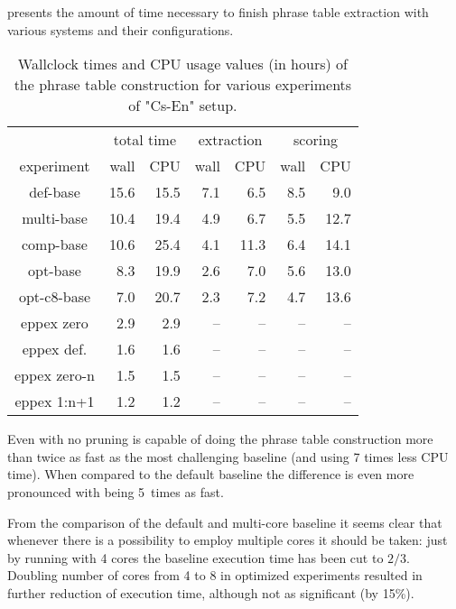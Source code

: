  presents the amount of time necessary to finish
phrase table extraction with various systems and their configurations.

\begin{table}[ht]
\centering
\begin{tabular}{ | c | r r | r r | r r | }
\hline
 & \multicolumn{2}{|c|}{total time} & \multicolumn{2}{|c|}{extraction} & \multicolumn{2}{|c|}{scoring} \\
experiment & wall & CPU & wall & CPU & wall & CPU \\
\hline
\hline
def-base      & 15.6 & 15.5 & 7.1 & 6.5 & 8.5 & 9.0 \\
multi-base    & 10.4 & 19.4 & 4.9 & 6.7 & 5.5 & 12.7 \\
comp-base     & 10.6 & 25.4 & 4.1 & 11.3 & 6.4 & 14.1 \\
opt-base      & 8.3 & 19.9 & 2.6 & 7.0 & 5.6 & 13.0 \\
opt-c8-base   & 7.0 & 20.7 & 2.3 & 7.2 & 4.7 & 13.6 \\
eppex zero    & 2.9 & 2.9 & -- & -- & -- & -- \\
\hline
eppex def.    & 1.6 & 1.6 & -- & -- & -- & -- \\
eppex zero-n  & 1.5 & 1.5 & -- & -- & -- & -- \\
eppex 1:n+1   & 1.2 & 1.2 & -- & -- & -- & -- \\
\hline
\end{tabular}
\caption{\label{cs-en-wmt13-time-benchmarks}
Wallclock times and CPU usage values (in hours) of the phrase table
construction for various experiments of "Cs-En" setup.}
\end{table}

Even with no pruning \eppex{} is capable of doing the phrase table construction more
than twice as fast as the most challenging baseline (and using 7 times less CPU time).
When compared to the default baseline the difference is even more pronounced with \eppex{}
being 5~times as fast.

From the comparison of the default and multi-core baseline it seems clear that whenever there
is a possibility to employ multiple cores it should be taken: just by running with 4 cores
the baseline execution time has been cut to $2/3$.
Doubling number of cores from 4 to 8 in optimized experiments resulted in further reduction
of execution time, although not as significant (by 15\%).

